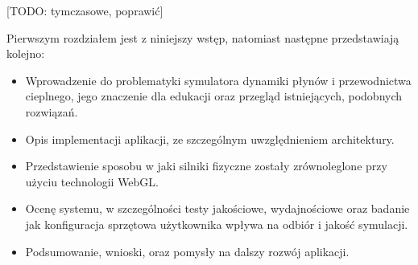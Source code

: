 [TODO: tymczasowe, poprawić]

Pierwszym rozdziałem jest z niniejszy wstęp, natomiast następne przedstawiają kolejno:

\begin{itemize}

\item Wprowadzenie do problematyki symulatora dynamiki płynów i przewodnictwa cieplnego, jego
znaczenie dla edukacji oraz przegląd istniejących, podobnych rozwiązań.

\item Opis implementacji aplikacji, ze szczególnym uwzględnieniem architektury.

\item Przedstawienie sposobu w jaki silniki fizyczne zostały zrównoleglone przy użyciu technologii
\mbox{WebGL}.

\item Ocenę systemu, w szczególności testy jakościowe, wydajnościowe oraz badanie jak konfiguracja
sprzętowa użytkownika wpływa na odbiór i jakość symulacji.

\item Podsumowanie, wnioski, oraz pomysły na dalszy rozwój aplikacji.

\end{itemize}

